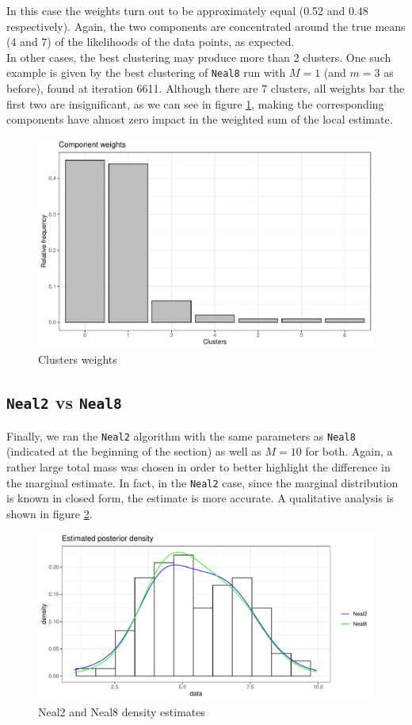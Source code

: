 In this case the weights turn out to be approximately equal (0.52 and 0.48 respectively).
Again, the two components are concentrated around the true means (4 and 7) of the likelihoods of the data points, as expected. \\
In other cases, the best clustering may produce more than 2 clusters.
One such example is given by the best clustering of \verb|Neal8| run with $M=1$ (and $m=3$ as before), found at iteration 6611.
Although there are 7 clusters, all weights bar the first two are insignificant, as we can see in figure \ref{fig:cluster_weigths}, making the corresponding components have almost zero impact in the weighted sum of the local estimate.

\clearpage

\begin{figure}[h]
	\centering
	\includegraphics[scale=0.4]{etc/barplotM1m3.pdf}
	\caption{Clusters weights}

	\label{fig:cluster_weigths}
	
\end{figure}



\subsection{\texttt{Neal2} vs \texttt{Neal8}}
Finally, we ran the \verb|Neal2| algorithm with the same parameters as \verb|Neal8| (indicated at the beginning of the section) as well as $M=10$ for both.
Again, a rather large total mass was chosen in order to better highlight the difference in the marginal estimate.
In fact, in the \verb|Neal2| case, since the marginal distribution is known in closed form, the estimate is more accurate. A qualitative analysis is shown in figure \ref{fig:neal2_neal8}.

\begin{figure}[h]
	\centering
	\includegraphics[scale=0.6]{etc/neal2_M10.pdf}
	\caption{Neal2 and Neal8 density estimates}

	\label{fig:neal2_neal8}
\end{figure}
